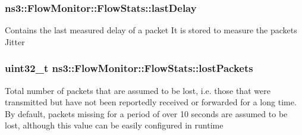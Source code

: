 \subsubsection[{\texorpdfstring{last\+Delay}{lastDelay}}]{ ns3\+::\+Flow\+Monitor\+::\+Flow\+Stats\+::last\+Delay}\hypertarget{structns3_1_1FlowMonitor_1_1FlowStats_a93ebfac09aec55697e4269ce228b8237}{}\label{structns3_1_1FlowMonitor_1_1FlowStats_a93ebfac09aec55697e4269ce228b8237}
Contains the last measured delay of a packet It is stored to measure the packet\textquotesingle{}s Jitter 
\subsubsection[{\texorpdfstring{lost\+Packets}{lostPackets}}]{\setlength{\rightskip}{0pt plus 5cm}uint32\+\_\+t ns3\+::\+Flow\+Monitor\+::\+Flow\+Stats\+::lost\+Packets}\hypertarget{structns3_1_1FlowMonitor_1_1FlowStats_a3a711adf30cb63ed20b5b3a8a9d5f5c6}{}\label{structns3_1_1FlowMonitor_1_1FlowStats_a3a711adf30cb63ed20b5b3a8a9d5f5c6}
Total number of packets that are assumed to be lost, i.\+e. those that were transmitted but have not been reportedly received or forwarded for a long time. By default, packets missing for a period of over 10 seconds are assumed to be lost, although this value can be easily configured in runtime 
